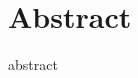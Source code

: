 \documentclass[thesis/Elad_Kliger_Thesis.tex]{subfiles}
\begin{document}
\section*{Abstract}
    abstract
\end{document}
